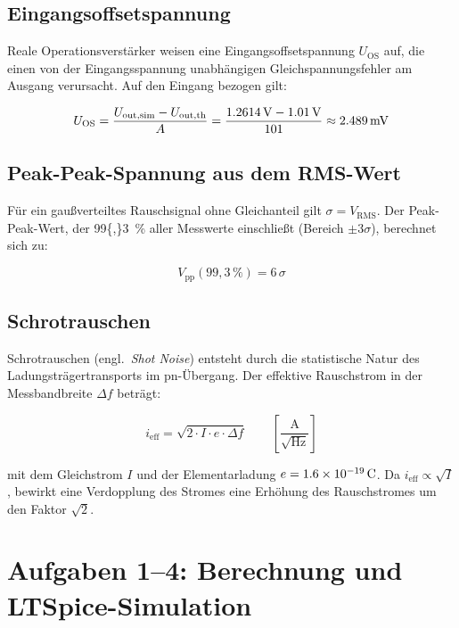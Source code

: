 \documentclass[12pt,a4paper]{article}
\begin{document}
\subsection{Eingangsoffsetspannung}

Reale Operationsverstärker weisen eine Eingangsoffsetspannung $U_\mathrm{OS}$
auf, die einen von der Eingangsspannung unabhängigen Gleichspannungsfehler am
Ausgang verursacht. Auf den Eingang bezogen gilt:

\begin{equation}
  U_\mathrm{OS}
  = \frac{U_\mathrm{out,sim} - U_\mathrm{out,th}}{A}
  = \frac{\SI{1{,}2614}{V} - \SI{1{,}01}{V}}{101}
  \approx \SI{2{,}489}{mV}
\end{equation}

\subsection{Peak-Peak-Spannung aus dem RMS-Wert}

Für ein gaußverteiltes Rauschsignal ohne Gleichanteil gilt $\sigma = V_\mathrm{RMS}$.
Der Peak-Peak-Wert, der \SI{99{,}3}{\%} aller Messwerte einschließt
(Bereich $\pm 3\sigma$), berechnet sich zu:

\begin{equation}
  V_\mathrm{pp}(99{,}3\,\%) = 6\,\sigma
  \label{eq:vpp}
\end{equation}

\subsection{Schrotrauschen}

Schrotrauschen (engl.\ \textit{Shot Noise}) entsteht durch die statistische
Natur des Ladungsträgertransports im pn-Übergang. Der effektive Rauschstrom
in der Messbandbreite $\Delta f$ beträgt:

\begin{equation}
  i_\mathrm{eff} = \sqrt{2 \cdot I \cdot e \cdot \Delta f}
  \qquad \left[\frac{\mathrm{A}}{\sqrt{\mathrm{Hz}}}\right]
\end{equation}

mit dem Gleichstrom $I$ und der Elementarladung $e = \SI{1{,}6e-19}{C}$.
Da $i_\mathrm{eff} \propto \sqrt{I}$, bewirkt eine Verdopplung des Stromes
eine Erhöhung des Rauschstromes um den Faktor $\sqrt{2}$.

\section{Aufgaben 1--4: Berechnung und LTSpice-Simulation}
\end{document}
